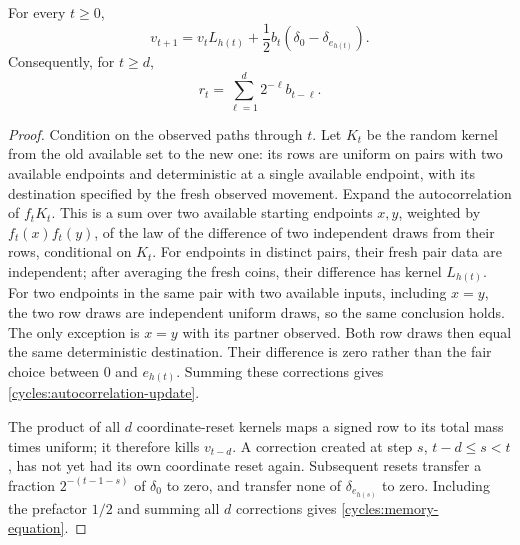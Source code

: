 \begin{lemma}
\label{cycles:memory}
For every $t\ge0$,
\begin{equation}\label{cycles:autocorrelation-update}
 v_{t+1}=v_tL_{h(t)}+\frac12b_t(\delta_0-\delta_{e_{h(t)}}).
\end{equation}
Consequently, for $t\ge d$,
\begin{equation}\label{cycles:memory-equation}
 r_t=\sum_{\ell=1}^d2^{-\ell}b_{t-\ell}.
\end{equation}
\end{lemma}
\begin{proof}
Condition on the observed paths through $t$. Let $K_t$ be the random
kernel from the old available set to the new one: its rows are uniform on
pairs with two available endpoints and deterministic at a single available endpoint, with
its destination specified by the fresh observed movement. Expand the
autocorrelation of $f_tK_t$. This is a sum over two available starting
endpoints $x,y$, weighted by $f_t(x)f_t(y)$, of the law of the difference
of two independent draws from their rows, conditional on $K_t$.
For endpoints in distinct pairs, their fresh pair data are independent;
after averaging the fresh coins, their difference has kernel $L_{h(t)}$.
For two endpoints in the same pair with two available inputs, including
$x=y$, the two row draws are independent uniform draws, so the same
conclusion holds.
The only exception is $x=y$ with its partner observed. Both row draws
then equal the same deterministic destination. Their difference is zero
rather than the fair choice between $0$ and $e_{h(t)}$.
Summing these corrections gives \eqref{cycles:autocorrelation-update}.

The product of all $d$ coordinate-reset kernels maps a signed row to
its total mass times uniform; it therefore kills $v_{t-d}$.
A correction created at step $s$, $t-d\le s<t$, has not yet had its
own coordinate reset again. Subsequent resets transfer a fraction
$2^{-(t-1-s)}$ of $\delta_0$ to zero, and transfer none of
$\delta_{e_{h(s)}}$ to zero. Including the prefactor $1/2$ and summing
all $d$ corrections gives \eqref{cycles:memory-equation}.
\end{proof}

